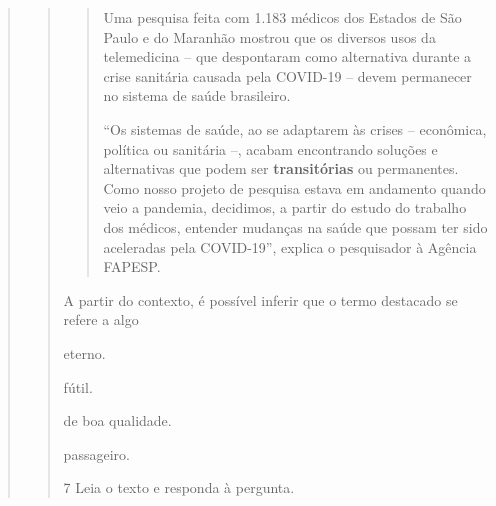 \begin{escolha}
\begin{escolha}
\begin{escolha}
\begin{quote}
\begin{quote}
\begin{quote}
Uma pesquisa feita com 1.183 médicos dos Estados de São Paulo e do
Maranhão mostrou que os diversos usos da telemedicina -- que despontaram
como alternativa durante a crise sanitária causada pela COVID-19 --
devem permanecer no sistema de saúde brasileiro.

``Os sistemas de saúde, ao se adaptarem às crises -- econômica, política
ou sanitária --, acabam encontrando soluções e alternativas que podem
ser \textbf{transitórias} ou permanentes. Como nosso projeto de pesquisa
estava em andamento quando veio a pandemia, decidimos, a partir do
estudo do trabalho dos médicos, entender mudanças na saúde que possam
ter sido aceleradas pela COVID-19'', explica o pesquisador à Agência
FAPESP.
\end{quote}


A partir do contexto, é possível inferir que o termo destacado se
refere a algo

\begin{escolha}
  \item eterno.

  \item fútil.

  \item de boa qualidade.

  \item passageiro.
\end{escolha}


\num{7} Leia o texto e responda à pergunta.


\end{quote}
\end{quote}
\end{escolha}
\end{escolha}
\end{escolha}
